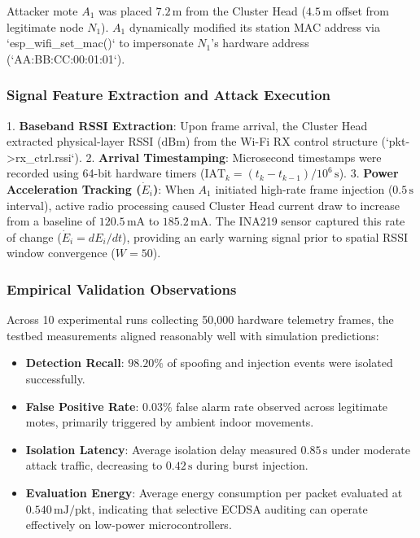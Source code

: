 \documentclass[conference]{IEEEtran}
\begin{document}
\begin{enumerate}
Attacker mote $A_1$ was placed $7.2\,\text{m}$ from the Cluster Head ($4.5\,\text{m}$ offset from legitimate node $N_1$). $A_1$ dynamically modified its station MAC address via `esp_wifi_set_mac()` to impersonate $N_1$'s hardware address (`AA:BB:CC:00:01:01`).

\subsubsection{Signal Feature Extraction and Attack Execution}
1. \textbf{Baseband RSSI Extraction}: Upon frame arrival, the Cluster Head extracted physical-layer RSSI ($\text{dBm}$) from the Wi-Fi RX control structure (`pkt->rx_ctrl.rssi`).
2. \textbf{Arrival Timestamping}: Microsecond timestamps were recorded using 64-bit hardware timers ($\text{IAT}_k = (t_k - t_{k-1})/10^6\,\text{s}$).
3. \textbf{Power Acceleration Tracking ($\dot{E}_i$)}: When $A_1$ initiated high-rate frame injection ($0.5\,\text{s}$ interval), active radio processing caused Cluster Head current draw to increase from a baseline of $120.5\,\text{mA}$ to $185.2\,\text{mA}$. The INA219 sensor captured this rate of change ($\dot{E}_i = dE_i/dt$), providing an early warning signal prior to spatial RSSI window convergence ($W=50$).

\subsubsection{Empirical Validation Observations}
Across 10 experimental runs collecting 50,000 hardware telemetry frames, the testbed measurements aligned reasonably well with simulation predictions:
\begin{itemize}
    \item \textbf{Detection Recall}: $98.20\%$ of spoofing and injection events were isolated successfully.
    \item \textbf{False Positive Rate}: $0.03\%$ false alarm rate observed across legitimate motes, primarily triggered by ambient indoor movements.
    \item \textbf{Isolation Latency}: Average isolation delay measured $0.85\,\text{s}$ under moderate attack traffic, decreasing to $0.42\,\text{s}$ during burst injection.
    \item \textbf{Evaluation Energy}: Average energy consumption per packet evaluated at $0.540\,\text{mJ/pkt}$, indicating that selective ECDSA auditing can operate effectively on low-power microcontrollers.
\end{itemize}


\end{enumerate}
\end{document}
